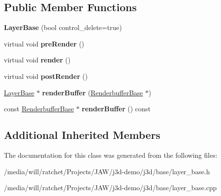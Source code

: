 \subsection*{Public Member Functions}
\begin{DoxyCompactItemize}
\item 
\hypertarget{classj3d_1_1base_1_1LayerBase_adad4d571ceaaa47d462eb028cd6f5466}{}{\bfseries Layer\+Base} (bool control\+\_\+delete=true)\label{classj3d_1_1base_1_1LayerBase_adad4d571ceaaa47d462eb028cd6f5466}

\item 
\hypertarget{classj3d_1_1base_1_1LayerBase_a7dbc963db84ba07205aeb4789dbaa6c7}{}virtual void {\bfseries pre\+Render} ()\label{classj3d_1_1base_1_1LayerBase_a7dbc963db84ba07205aeb4789dbaa6c7}

\item 
\hypertarget{classj3d_1_1base_1_1LayerBase_a27ec2f264362dd5f6f93c78f3ae5c43c}{}virtual void {\bfseries render} ()\label{classj3d_1_1base_1_1LayerBase_a27ec2f264362dd5f6f93c78f3ae5c43c}

\item 
\hypertarget{classj3d_1_1base_1_1LayerBase_ab947f8f6006b70e95a3c7b1f91f72f35}{}virtual void {\bfseries post\+Render} ()\label{classj3d_1_1base_1_1LayerBase_ab947f8f6006b70e95a3c7b1f91f72f35}

\item 
\hypertarget{classj3d_1_1base_1_1LayerBase_aea32226a5ced8fc6b3bf9148f25ec034}{}\hyperlink{classj3d_1_1base_1_1LayerBase}{Layer\+Base} $\ast$ {\bfseries render\+Buffer} (\hyperlink{classj3d_1_1base_1_1RenderbufferBase}{Renderbuffer\+Base} $\ast$)\label{classj3d_1_1base_1_1LayerBase_aea32226a5ced8fc6b3bf9148f25ec034}

\item 
\hypertarget{classj3d_1_1base_1_1LayerBase_a5999d2361f01fb74b07bea1ec78a6592}{}const \hyperlink{classj3d_1_1base_1_1RenderbufferBase}{Renderbuffer\+Base} $\ast$ {\bfseries render\+Buffer} () const \label{classj3d_1_1base_1_1LayerBase_a5999d2361f01fb74b07bea1ec78a6592}

\end{DoxyCompactItemize}
\subsection*{Additional Inherited Members}


The documentation for this class was generated from the following files\+:\begin{DoxyCompactItemize}
\item 
/media/will/ratchet/\+Projects/\+J\+A\+W/j3d-\/demo/j3d/base/layer\+\_\+base.\+h\item 
/media/will/ratchet/\+Projects/\+J\+A\+W/j3d-\/demo/j3d/base/layer\+\_\+base.\+cpp\end{DoxyCompactItemize}
